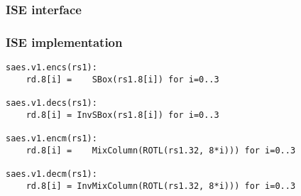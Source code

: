 
\subsubsection{ISE interface}



\subsubsection{ISE implementation}

\begin{lstlisting}[language=pseudo,style=block]
saes.v1.encs(rs1):
    rd.8[i] =    SBox(rs1.8[i]) for i=0..3

saes.v1.decs(rs1):
    rd.8[i] = InvSBox(rs1.8[i]) for i=0..3

saes.v1.encm(rs1):
    rd.8[i] =    MixColumn(ROTL(rs1.32, 8*i))) for i=0..3

saes.v1.decm(rs1):
    rd.8[i] = InvMixColumn(ROTL(rs1.32, 8*i))) for i=0..3
\end{lstlisting}


